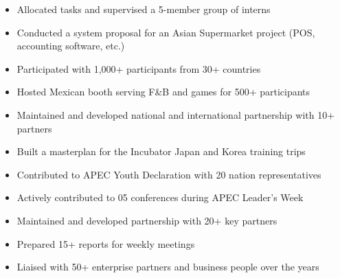 \documentclass[10pt,a4paper,ragged2e]{altacv}
\begin{document}
\begin{itemize}
	\item Allocated tasks and supervised a 5-member group of interns
	\item Conducted a system proposal for an Asian Supermarket project (POS, accounting software, etc.)
\end{itemize}

\divider

\begin{itemize}
	\item Participated with 1,000+ participants from 30+ countries
	\item Hosted Mexican booth serving F\&B and games for 500+ participants
\end{itemize}

\divider

\begin{itemize}
	\item Maintained and developed national and international partnership with 10+ partners
	\item Built a masterplan for the Incubator Japan and Korea training trips 
\end{itemize}

\divider

\begin{itemize}
	\item Contributed to APEC Youth Declaration with 20 nation representatives
	\item Actively contributed to 05 conferences during APEC Leader's Week
\end{itemize}

\divider

\begin{itemize}
	\item Maintained and developed partnership with 20+ key partners
	\item Prepared 15+ reports for weekly meetings
	\item Liaised with 50+ enterprise partners and business people over the years
\end{itemize}
\end{document}
